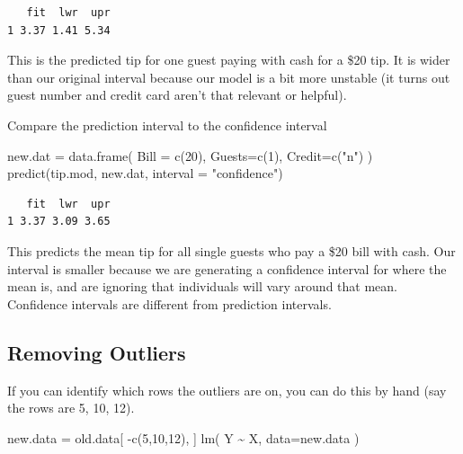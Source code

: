 \documentclass[
  letterpaper,
  DIV=11,
  numbers=noendperiod]{scrreprt}
\newenvironment{Shaded}{}{}
\newcommand{\AttributeTok}[1]{\textcolor[rgb]{0.49,0.56,0.16}{#1}}
\newcommand{\DecValTok}[1]{\textcolor[rgb]{0.25,0.63,0.44}{#1}}
\newcommand{\FunctionTok}[1]{\textcolor[rgb]{0.02,0.16,0.49}{#1}}
\newcommand{\NormalTok}[1]{#1}
\newcommand{\OtherTok}[1]{\textcolor[rgb]{0.00,0.44,0.13}{#1}}
\newcommand{\SpecialCharTok}[1]{\textcolor[rgb]{0.25,0.44,0.63}{#1}}
\newcommand{\StringTok}[1]{\textcolor[rgb]{0.25,0.44,0.63}{#1}}
\begin{document}
\begin{verbatim}
   fit  lwr  upr
1 3.37 1.41 5.34
\end{verbatim}

This is the predicted tip for one guest paying with cash for a \$20 tip.
It is wider than our original interval because our model is a bit more
unstable (it turns out guest number and credit card aren't that relevant
or helpful).

Compare the prediction interval to the confidence interval

\begin{Shaded}
\begin{Highlighting}[]
\NormalTok{new.dat }\OtherTok{=} \FunctionTok{data.frame}\NormalTok{( }\AttributeTok{Bill =} \FunctionTok{c}\NormalTok{(}\DecValTok{20}\NormalTok{), }\AttributeTok{Guests=}\FunctionTok{c}\NormalTok{(}\DecValTok{1}\NormalTok{), }\AttributeTok{Credit=}\FunctionTok{c}\NormalTok{(}\StringTok{"n"}\NormalTok{) )}
\FunctionTok{predict}\NormalTok{(tip.mod, new.dat, }\AttributeTok{interval =} \StringTok{"confidence"}\NormalTok{)}
\end{Highlighting}
\end{Shaded}

\begin{verbatim}
   fit  lwr  upr
1 3.37 3.09 3.65
\end{verbatim}

This predicts the mean tip for all single guests who pay a \$20 bill
with cash. Our interval is smaller because we are generating a
confidence interval for where the mean is, and are ignoring that
individuals will vary around that mean. Confidence intervals are
different from prediction intervals.

\subsection{Removing Outliers}\label{removing-outliers}

If you can identify which rows the outliers are on, you can do this by
hand (say the rows are 5, 10, 12).

\begin{Shaded}
\begin{Highlighting}[]
\NormalTok{new.data }\OtherTok{=}\NormalTok{ old.data[ }\SpecialCharTok{{-}}\FunctionTok{c}\NormalTok{(}\DecValTok{5}\NormalTok{,}\DecValTok{10}\NormalTok{,}\DecValTok{12}\NormalTok{), ]}
\FunctionTok{lm}\NormalTok{( Y }\SpecialCharTok{\textasciitilde{}}\NormalTok{ X, }\AttributeTok{data=}\NormalTok{new.data )}
\end{Highlighting}
\end{Shaded}
\end{document}
